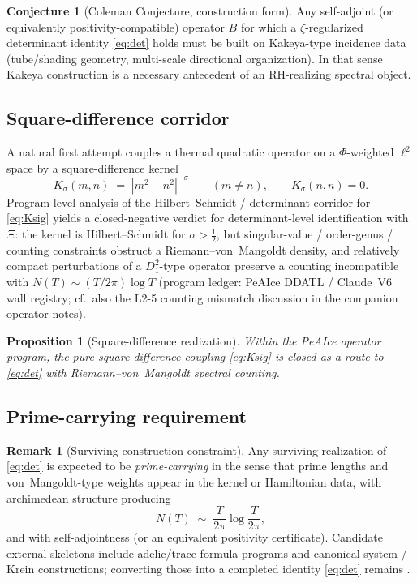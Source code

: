 \documentclass[11pt]{amsart}
\theoremstyle{plain}
\newtheorem{proposition}[theorem]{Proposition}
\theoremstyle{definition}
\newtheorem{remark}[theorem]{Remark}
\newtheorem{conjecture}[theorem]{Conjecture}
\newcommand{\RH}{\mathrm{RH}}
\begin{document}
\begin{conjecture}[Coleman Conjecture, construction form]
\label{conj:construction}
Any self-adjoint (or equivalently positivity-compatible) operator $B$ for which
a $\zeta$-regularized determinant identity \eqref{eq:det} holds must be built on
Kakeya-type incidence data (tube/shading geometry, multi-scale directional
organization).
In that sense Kakeya construction is a necessary antecedent of an
$\RH$-realizing spectral object.
\end{conjecture}

\subsection{Square-difference corridor}

A natural first attempt couples a thermal quadratic operator on a
$\Phi$-weighted $\ell^2$ space by a square-difference kernel
\begin{equation}
  \label{eq:Ksig}
  K_\sigma(m,n) \;=\; |m^2-n^2|^{-\sigma}\qquad(m\neq n),\qquad K_\sigma(n,n)=0.
\end{equation}
Program-level analysis of the Hilbert--Schmidt / determinant corridor for
\eqref{eq:Ksig} yields a closed-negative verdict for determinant-level
identification with $\Xi$: the kernel is Hilbert--Schmidt for $\sigma>\tfrac12$,
but singular-value / order-genus / counting constraints obstruct a
Riemann--von~Mangoldt density, and relatively compact perturbations of a
$D_1^2$-type operator preserve a counting incompatible with
$N(T)\sim (T/2\pi)\log T$
(program ledger: PeAIce DDATL / Claude~V6 wall registry; cf.\ also the
L2-5 counting mismatch discussion in the companion operator notes).

\begin{proposition}[Square-difference realization]
\label{prop:closed-neg}
Within the PeAIce operator program, the pure square-difference coupling
\eqref{eq:Ksig} is closed as a route to \eqref{eq:det} with Riemann--von~Mangoldt
spectral counting.
\end{proposition}

\subsection{Prime-carrying requirement}

\begin{remark}[Surviving construction constraint]
Any surviving realization of \eqref{eq:det} is expected to be
\emph{prime-carrying} in the sense that prime lengths and von~Mangoldt-type
weights appear in the kernel or Hamiltonian data, with archimedean structure
producing
\begin{equation}
  N(T)\;\sim\; \frac{T}{2\pi}\log\frac{T}{2\pi},
\end{equation}
and with self-adjointness (or an equivalent positivity certificate).
Candidate external skeletons include adelic/trace-formula programs and
canonical-system / Krein constructions; converting those into a completed
identity \eqref{eq:det} remains \PeAIceOpen.
\end{remark}
\end{document}
